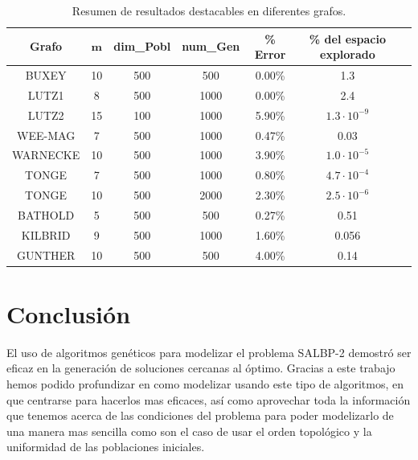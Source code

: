 \documentclass[12pt,a4paper]{report}
\begin{document}
\begin{table}[H]
    \centering
    
    \label{tab:otros-resultados}
    \begin{tabular}{|c|c|c|c|c|c|c|}
        \hline
        \textbf{Grafo} & $\mathbf{m}$ & \textbf{dim\_Pobl} & \textbf{num\_Gen} & \textbf{\% Error} & \textbf{\% del espacio explorado} \\
        \hline
        BUXEY      & 10 & 500 & 500  & 0.00\%  & 1.3 \\
        LUTZ1      & 8  & 500 & 1000 & 0.00\%  & 2.4 \\
        LUTZ2      & 15 & 100 & 1000 & 5.90\%  & $1.3 \cdot 10^{-9}$ \\
        WEE-MAG    & 7  & 500 & 1000 & 0.47\%  & 0.03 \\
        WARNECKE   & 10 & 500 & 1000 & 3.90\%  & $1.0 \cdot 10^{-5}$ \\
        TONGE      & 7  & 500 & 1000 & 0.80\%  & $4.7 \cdot 10^{-4}$ \\
        TONGE      & 10 & 500 & 2000 & 2.30\%  & $2.5 \cdot 10^{-6}$ \\
        BATHOLD    & 5  & 500 & 500  & 0.27\%  & 0.51 \\
        KILBRID    & 9  & 500 & 1000 & 1.60\%  & 0.056 \\
        GUNTHER    & 10 & 500 & 500  & 4.00\%  & 0.14 \\
        \hline
    \end{tabular}
    \caption{Resumen de resultados destacables en diferentes grafos.}
\end{table}

\section{Conclusión}

El uso de algoritmos genéticos para modelizar el problema SALBP-2 demostró ser eficaz en la generación de soluciones cercanas al óptimo. Gracias a este trabajo hemos podido profundizar en como modelizar usando este tipo de algoritmos, en que centrarse para hacerlos mas eficaces, así como aprovechar toda la información que tenemos acerca de las condiciones del problema para poder modelizarlo de una manera mas sencilla como son el caso de usar el orden topológico y la uniformidad de las poblaciones iniciales.
\end{document}
